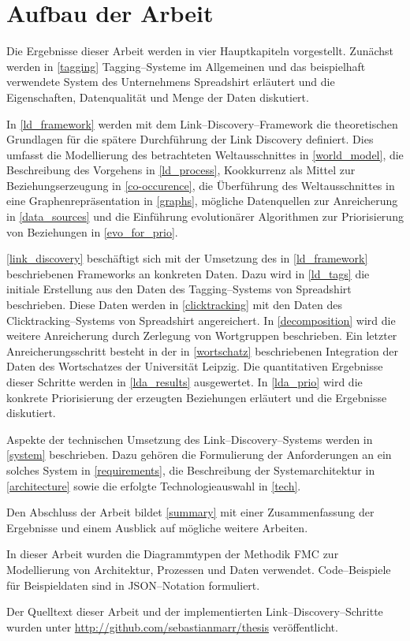 \section{Aufbau der Arbeit}

Die Ergebnisse dieser Arbeit werden in vier Hauptkapiteln vorgestellt. Zunächst werden in \cref{tagging} Tagging--Systeme im Allgemeinen und das beispielhaft verwendete System des Unternehmens Spreadshirt erläutert und die Eigenschaften, Datenqualität und Menge der Daten diskutiert.

In \cref{ld_framework} werden mit dem Link--Discovery--Framework die theoretischen Grundlagen für die spätere Durchführung der Link Discovery definiert. Dies umfasst die Modellierung des betrachteten Weltausschnittes in \cref{world_model}, die Beschreibung des Vorgehens in \cref{ld_process}, Kookkurrenz als Mittel zur Beziehungserzeugung in \cref{co-occurence}, die Überführung des Weltausschnittes in eine Graphenrepräsentation in \cref{graphs}, mögliche Datenquellen zur Anreicherung in \cref{data_sources} und die Einführung evolutionärer Algorithmen zur Priorisierung von Beziehungen in \cref{evo_for_prio}.

\cref{link_discovery} beschäftigt sich mit der Umsetzung des in \cref{ld_framework} beschriebenen Frameworks an konkreten Daten. Dazu wird in \cref{ld_tags} die initiale Erstellung aus den Daten des Tagging--Systems von Spreadshirt beschrieben. Diese Daten werden in \cref{clicktracking} mit den Daten des Clicktracking--Systems von Spreadshirt angereichert. In \cref{decomposition} wird die weitere Anreicherung durch Zerlegung von Wortgruppen beschrieben. Ein letzter Anreicherungsschritt besteht in der in \cref{wortschatz} beschriebenen Integration der Daten des Wortschatzes der Universität Leipzig. Die quantitativen Ergebnisse dieser Schritte werden in \cref{lda_results} ausgewertet. In \cref{lda_prio} wird die konkrete Priorisierung der erzeugten Beziehungen erläutert und die Ergebnisse diskutiert.

Aspekte der technischen Umsetzung des Link--Discovery--Systems werden in \cref{system} beschrieben. Dazu gehören die Formulierung der Anforderungen an ein solches System in \cref{requirements}, die Beschreibung der Systemarchitektur in \cref{architecture} sowie die erfolgte Technologieauswahl in \cref{tech}.

Den Abschluss der Arbeit bildet \cref{summary} mit einer Zusammenfassung der Ergebnisse und einem Ausblick auf mögliche weitere Arbeiten.

In dieser Arbeit wurden die Diagrammtypen der Methodik FMC \cite{fmc} zur Modellierung von Architektur, Prozessen und Daten verwendet. Code--Beispiele für Beispieldaten sind in JSON--Notation \cite{json2006} formuliert.

Der Quelltext dieser Arbeit und der implementierten Link--Discovery--Schritte wurden unter \url{http://github.com/sebastianmarr/thesis} veröffentlicht.